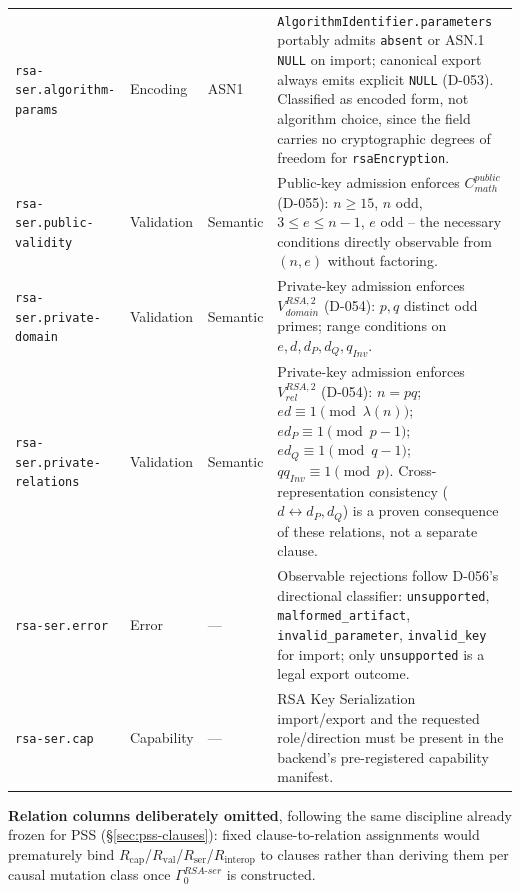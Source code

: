 \documentclass[11pt,a4paper]{article}
\begin{document}
\begin{longtable}{p{}p{}p{}p{}}
\texttt{rsa-ser.algorithm-params} &
Encoding &
ASN1 &
\texttt{AlgorithmIdentifier.parameters} portably admits \texttt{absent} or ASN.1 \texttt{NULL} on import; canonical export always emits explicit \texttt{NULL} (D-053). Classified as encoded form, not algorithm choice, since the field carries no cryptographic degrees of freedom for \texttt{rsaEncryption}.\\

\texttt{rsa-ser.public-validity} &
Validation &
Semantic &
Public-key admission enforces $C_{math}^{public}$ (D-055): $n\ge15$, $n$ odd, $3\le e\le n-1$, $e$ odd -- the necessary conditions directly observable from $(n,e)$ without factoring.\\

\texttt{rsa-ser.private-domain} &
Validation &
Semantic &
Private-key admission enforces $V_{domain}^{RSA,2}$ (D-054): $p,q$ distinct odd primes; range conditions on $e,d,d_P,d_Q,q_{Inv}$.\\

\texttt{rsa-ser.private-relations} &
Validation &
Semantic &
Private-key admission enforces $V_{rel}^{RSA,2}$ (D-054): $n=pq$; $ed\equiv1\pmod{\lambda(n)}$; $ed_P\equiv1\pmod{p-1}$; $ed_Q\equiv1\pmod{q-1}$; $qq_{Inv}\equiv1\pmod p$. Cross-representation consistency ($d\leftrightarrow d_P,d_Q$) is a proven consequence of these relations, not a separate clause.\\

\texttt{rsa-ser.error} &
Error &
--- &
Observable rejections follow D-056's directional classifier: \texttt{unsupported}, \texttt{malformed\_artifact}, \texttt{invalid\_parameter}, \texttt{invalid\_key} for import; only \texttt{unsupported} is a legal export outcome.\\

\texttt{rsa-ser.cap} &
Capability &
--- &
RSA Key Serialization import/export and the requested role/direction must be present in the backend's pre-registered capability manifest.\\

\end{longtable}

\textbf{Relation columns deliberately omitted}, following the same discipline already frozen for PSS (\S\ref{sec:pss-clauses}): fixed clause-to-relation assignments would prematurely bind $R_{\text{cap}}$/$R_{\text{val}}$/$R_{\text{ser}}$/$R_{\text{interop}}$ to clauses rather than deriving them per causal mutation class once $\Gamma_0^{RSA\text{-}ser}$ is constructed.
\end{document}
